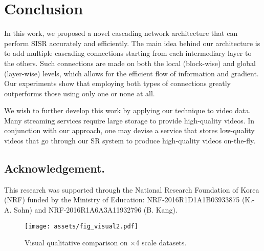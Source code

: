 \documentclass[runningheads]{llncs}
\begin{document}
\section{Conclusion}
\label{sec:conclusion}
In this work, we proposed a novel cascading network architecture that can perform SISR accurately and efficiently. The main idea behind our architecture is to add multiple cascading connections starting from each intermediary layer to the others. Such connections are made on both the local (block-wise) and global (layer-wise) levels, which allows for the efficient flow of information and gradient. Our experiments show that employing both types of connections greatly outperforms those using only one or none at all.

We wish to further develop this work by applying our technique to video data. Many streaming services require large storage to provide high-quality videos. In conjunction with our approach, one may devise a service that stores low-quality videos that go through our SR system to produce high-quality videos on-the-fly.

\subsection*{Acknowledgement.}
This research was supported through the National Research Foundation of Korea (NRF) funded by the Ministry of Education: NRF-2016R1D1A1B03933875 (K.-A. Sohn) and NRF-2016R1A6A3A11932796 (B. Kang).

\begin{figure*}[htbp]
\centering
\texttt{[image: assets/fig\_visual2.pdf]}
\caption{Visual qualitative comparison on $\times$4 scale datasets.}
\label{fig:comparison}
\end{figure*}



\end{document}
